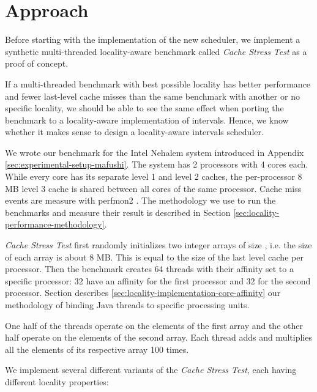 
\chapter{Approach}
\label{chap:locality-approach}

Before starting with the implementation of the new scheduler, we
implement a synthetic multi-threaded locality-aware benchmark called
\emph{Cache Stress Test} as a proof of concept.

If a multi-threaded benchmark with best possible locality has better
performance and fewer last-level cache misses than the same benchmark
with another or no specific locality, we should be able to see the
same effect when porting the benchmark to a locality-aware
implementation of intervals. Hence, we know whether it makes sense to
design a locality-aware intervals scheduler.

We wrote our benchmark for the Intel Nehalem system introduced in
Appendix \ref{sec:experimental-setup-mafushi}. The system has 2
processors with 4 cores each. While every core has its separate level
1 and level 2 caches, the per-processor 8 MB level 3 cache is shared
between all cores of the same processor. Cache miss events are measure
with perfmon2 \cite{Eranian2008}. The methodology we use to run the
benchmarks and measure their result is described in Section
\ref{sec:locality-performance-methodology}.

\emph{Cache Stress Test} first randomly initializes two integer arrays
of size , i.e. the size of each array is about 8
MB. This is equal to the size of the last level cache per
processor. Then the benchmark creates 64 threads with their affinity
set to a specific processor: 32 have an affinity for the first
processor and 32 for the second processor. Section describes
\ref{sec:locality-implementation-core-affinity} our methodology of
binding Java threads to specific processing units.

One half of the threads operate on the elements of the first array and
the other half operate on the elements of the second array. Each
thread adds and multiplies all the elements of its respective array
100 times.

We implement several different variants of the \emph{Cache Stress
  Test}, each having different locality properties:

